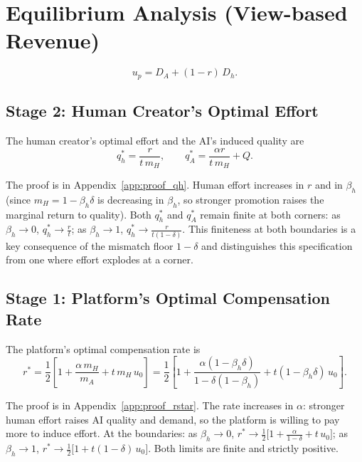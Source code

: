 \documentclass[mnsc,nonblindrev]{informs3_NoOR}
\begin{document}
\section{Equilibrium Analysis (View-based Revenue)}
\label{sec:analysis}
\begin{equation}
    u_p = D_A + (1-r)\,D_h.
    \label{eq:up}
\end{equation}

\subsection{Stage 2: Human Creator's Optimal Effort}

\begin{proposition}
\label{prop:qh}
The human creator's optimal effort and the AI's induced quality are
\begin{equation}
    q_h^* = \frac{r}{t\,m_H}, \qquad
    q_A^* = \frac{\alpha r}{t\,m_H} + Q.
    \label{eq:qhstar}
\end{equation}
\end{proposition}

\noindent The proof is in Appendix~\ref{app:proof_qh}. Human effort increases in $r$ and in $\beta_h$ (since $m_H = 1-\beta_h\delta$ is decreasing in $\beta_h$, so stronger promotion raises the marginal return to quality). Both $q_h^*$ and $q_A^*$ remain finite at both corners: as $\beta_h \to 0$, $q_h^* \to \tfrac{r}{t}$; as $\beta_h \to 1$, $q_h^* \to \tfrac{r}{t(1-\delta)}$. This finiteness at both boundaries is a key consequence of the mismatch floor $1-\delta$ and distinguishes this specification from one where effort explodes at a corner.

\subsection{Stage 1: Platform's Optimal Compensation Rate}

\begin{proposition}
\label{prop:rstar}
The platform's optimal compensation rate is
\begin{equation}
    r^* = \frac{1}{2}\left[1 + \frac{\alpha\,m_H}{m_A} + t\,m_H\,u_0\right]
        = \frac{1}{2}\left[1 + \frac{\alpha(1-\beta_h\delta)}{1-\delta(1-\beta_h)} + t(1-\beta_h\delta)\,u_0\right].
    \label{eq:rstar}
\end{equation}
\end{proposition}

\noindent The proof is in Appendix~\ref{app:proof_rstar}. The rate increases in $\alpha$: stronger human effort raises AI quality and demand, so the platform is willing to pay more to induce effort. At the boundaries: as $\beta_h \to 0$, $r^* \to \tfrac{1}{2}\bigl[1 + \tfrac{\alpha}{1-\delta} + t\,u_0\bigr]$; as $\beta_h \to 1$, $r^* \to \tfrac{1}{2}\bigl[1 + t(1-\delta)\,u_0\bigr]$. Both limits are finite and strictly positive.
\end{document}
